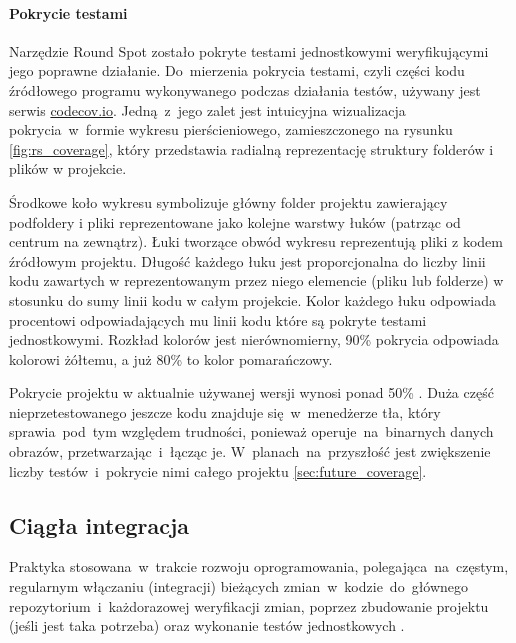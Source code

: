\paragraph{Pokrycie testami}
\label{par:test_coverage}
Narzędzie Round Spot zostało pokryte testami jednostkowymi weryfikującymi jego poprawne działanie. Do~mierzenia pokrycia testami, czyli części kodu źródłowego programu wykonywanego podczas działania testów, używany jest serwis \href{https://codecov.io/}{codecov.io}. Jedną~z~jego zalet jest intuicyjna wizualizacja pokrycia~w~formie wykresu pierścieniowego, zamieszczonego na rysunku \ref{fig:rs_coverage}, który przedstawia radialną reprezentację struktury folderów i plików w projekcie. 

\bigskip
{}

Środkowe koło wykresu symbolizuje główny folder projektu zawierający podfoldery i pliki reprezentowane jako kolejne warstwy łuków (patrząc od centrum na zewnątrz). Łuki tworzące obwód wykresu reprezentują pliki z kodem źródłowym projektu. Długość każdego łuku jest proporcjonalna do liczby linii kodu zawartych w reprezentowanym przez niego elemencie (pliku lub folderze) w stosunku do sumy linii kodu w całym projekcie. Kolor każdego łuku odpowiada procentowi odpowiadających mu linii kodu które są pokryte testami jednostkowymi. Rozkład kolorów jest nierównomierny, 90\% pokrycia odpowiada kolorowi żółtemu, a już 80\% to kolor pomarańczowy. 

Pokrycie projektu w aktualnie używanej wersji wynosi ponad 50\% \cite{RS_Coverage}. Duża część nieprzetestowanego jeszcze kodu znajduje się~w~menedżerze tła, który sprawia~pod~tym względem trudności, ponieważ operuje~na~binarnych danych obrazów, przetwarzając~i~łącząc je. W~planach~na~przyszłość jest zwiększenie liczby testów~i~pokrycie nimi całego projektu \ref{sec:future_coverage}.

\subsection{Ciągła integracja}
\label{sec:rs_ci}
Praktyka stosowana~w~trakcie rozwoju oprogramowania, polegająca~na~częstym, regularnym włączaniu (integracji) bieżących zmian~w~kodzie~do~głównego repozytorium~i~każdorazowej weryfikacji zmian, poprzez zbudowanie projektu (jeśli jest taka potrzeba) oraz wykonanie testów jednostkowych \cite{CI_definition}.

